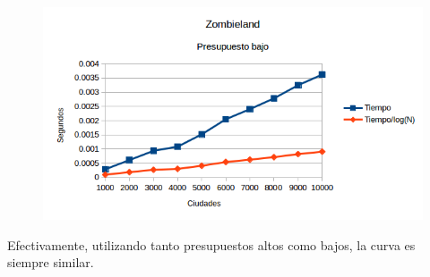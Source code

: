 \newpage
 
  \begin{figure}[h!]
   \begin{center}
 	\includegraphics{imagenes/ej1/Mediciones/Grafico4.png}
   \end{center}
 \end{figure}
 
 
Efectivamente, utilizando tanto presupuestos altos como bajos, la curva es siempre similar.

\newpage
 





